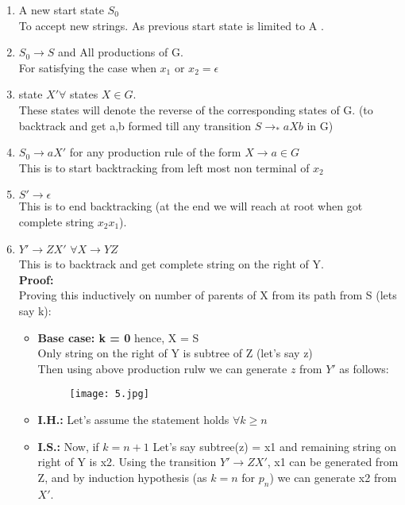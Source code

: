 \documentclass{article}
\begin{document}
\begin{enumerate}
    \item A new start state $S_0$\\
    To accept new strings. As previous start state is limited to A .
    \item $S_0 \rightarrow S$ and All productions of G.\\
    For satisfying the case when $x_1 \text{ or } x_2 = \epsilon$
    \item state $X' \forall $ states $X \in G$.\\
    These states will denote the reverse of the corresponding states of G. (to backtrack and get a,b formed till any transition $S \rightarrow_* aXb$ in G)
    \item $S_0 \rightarrow aX'$ for any production rule of the form $X \rightarrow a \in G$\\
    This is to start backtracking from left most non terminal of $x_2$
    \item $S' \rightarrow \epsilon$\\
    This is to end backtracking (at the end we will reach at root when got complete string $x_2x_1$).
    \item $Y' \rightarrow ZX' $ $\forall X \rightarrow YZ$\\
    This is to backtrack and get complete string on the right of Y.\\
    \textbf{Proof: }\\
    Proving this inductively on number of parents of X from its path from S (lets say k):\\
    \begin{itemize}
        \item \textbf{Base case: k = 0} hence, X = S\\
        Only string on the right of Y is subtree of Z (let's say z)\\
        Then using above production rulw we can generate $z$ from $Y'$ as follows:\\

        \begin{figure}[H]
            \centering
            \texttt{[image: 5.jpg]}
        \end{figure}

        \item \textbf{I.H.:} Let's assume the statement holds $\forall k \geq n $
        \item \textbf{I.S.: } Now, if $k = n+1$ 
        Let's say subtree(z) = x1 and remaining string on right of Y is x2.
        Using the transition $Y' \rightarrow ZX' $, x1 can be generated from Z, and by induction hypothesis (as $k = n$ for $p_n$) we can generate x2 from $X'$.


\end{itemize}
\end{enumerate}
\end{document}
